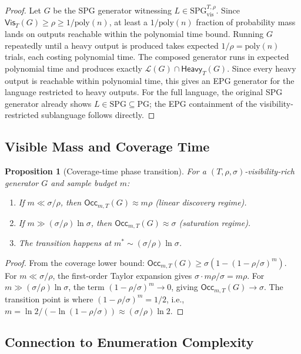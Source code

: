 \documentclass[11pt]{article}
\newcommand{\SPG}{\text{SPG}}
\newcommand{\PG}{\text{PG}}
\newcommand{\SPGvis}[2]{\mathrm{SPG}_{\mathrm{vis}}^{#1,#2}}
\newtheorem{proposition}[definition]{Proposition}
\theoremstyle{remark}
\theoremstyle{definition}
\begin{document}
\begin{proof}
Let $G$ be the SPG generator witnessing $L \in \SPGvis{T}{\rho}$.  Since
$\mathsf{Vis}_T(G) \ge \rho \ge 1/\mathrm{poly}(n)$, at least a
$1/\mathrm{poly}(n)$ fraction of probability mass lands on outputs reachable
within the polynomial time bound.  Running $G$ repeatedly until a heavy output
is produced takes expected $1/\rho = \mathrm{poly}(n)$ trials, each costing
polynomial time.  The composed generator runs in expected polynomial time and
produces exactly $\mathcal{L}(G) \cap \mathsf{Heavy}_T(G)$.  Since every heavy
output is reachable within polynomial time, this gives an EPG generator for
the language restricted to heavy outputs.  For the full language, the original
SPG generator already shows $L \in \SPG{} \subseteq \PG{}$; the EPG containment
of the visibility-restricted sublanguage follows directly.
\end{proof}

\subsection{Visible Mass and Coverage Time}

\begin{proposition}[Coverage-time phase transition]
For a $(T, \rho, \sigma)$-visibility-rich generator $G$ and sample budget
$m$:
\begin{enumerate}
  \item If $m \ll \sigma/\rho$, then $\mathsf{Occ}_{m,T}(G) \approx m\rho$
    (linear discovery regime).
  \item If $m \gg (\sigma/\rho) \ln \sigma$, then
    $\mathsf{Occ}_{m,T}(G) \approx \sigma$ (saturation regime).
  \item The transition happens at $m^* \sim (\sigma/\rho) \ln \sigma$.
\end{enumerate}
\end{proposition}

\begin{proof}
From the coverage lower bound:
$\mathsf{Occ}_{m,T}(G) \ge \sigma(1 - (1-\rho/\sigma)^m)$.
For $m \ll \sigma/\rho$, the first-order Taylor expansion gives
$\sigma \cdot m\rho/\sigma = m\rho$.
For $m \gg (\sigma/\rho)\ln\sigma$, the term $(1-\rho/\sigma)^m \to 0$,
giving $\mathsf{Occ}_{m,T}(G) \to \sigma$.
The transition point is where $(1-\rho/\sigma)^m = 1/2$, i.e.,
$m = \ln 2 / (-\ln(1-\rho/\sigma)) \approx (\sigma/\rho)\ln 2$.
\end{proof}

\subsection{Connection to Enumeration Complexity}
\end{document}
